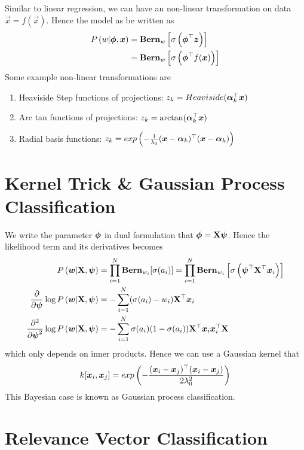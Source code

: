 Similar to linear regression, we can have an non-linear transformation on data $\vec{x}=f(\vec{x})$. Hence the model as be written as
\begin{align*}
	P\left(w|\boldsymbol{\phi},\boldsymbol{x}\right)&=\mathbf{Bern}_w\left[\sigma\left(\boldsymbol{\phi}^\top\boldsymbol{z}\right)\right] \\
	&=\mathbf{Bern}_w\left[\sigma\left(\boldsymbol{\phi}^\top f(\boldsymbol{x})\right)\right]
\end{align*}
Some example non-linear transformations are
\begin{enumerate}
	\item Heaviside Step functions of projections: $z_k=Heaviside(\boldsymbol{\alpha}_k^\top\boldsymbol{x})$
	\item Arc tan functions of projections: $z_k=\arctan(\boldsymbol{\alpha}_k^\top\boldsymbol{x})$
	\item Radial basis functions: $z_k=exp\left(-\frac{1}{\lambda_0}(\boldsymbol{x}-\boldsymbol{\alpha}_k){}^\top(\boldsymbol{x}-\boldsymbol{\alpha}_k)\right)$
\end{enumerate}



\section{Kernel Trick \& Gaussian Process Classification}
\label{section7.4}

We write the parameter $\boldsymbol{\phi}$ in dual formulation that $\boldsymbol{\phi}=\mathbf{X}\boldsymbol{\psi}$. Hence the likelihood term and its derivatives becomes
\begin{align*}
	P\left(\boldsymbol{w}|\mathbf{X},\boldsymbol{\psi}\right)&=\prod_{i=1}^N\mathbf{Bern}_{w_i}[\sigma(a_i)]=\prod_{i=1}^N\mathbf{Bern}_{w_i}\left[\sigma\left(\boldsymbol{\psi}^\top\mathbf{X}^\top\boldsymbol{x}_i\right)\right] \\
	\frac{\partial}{\partial\boldsymbol{\psi}}\log P\left(\boldsymbol{w}|\mathbf{X},\boldsymbol{\psi}\right)&=-\sum_{i=1}^N(\sigma(a_i)-w_i)\mathbf{X}^\top\boldsymbol{x}_i \\
	\frac{\partial^2}{\partial\boldsymbol{\psi}^2}\log P\left(\boldsymbol{w}|\mathbf{X},\boldsymbol{\psi}\right)&=-\sum_{i=1}^N\sigma(a_i)(1-\sigma(a_i))\mathbf{X}^\top\boldsymbol{x}_i\boldsymbol{x}_i^\top\mathbf{X}
\end{align*}
which only depends on inner products. Hence we can use a Gaussian kernel that
\begin{align*}
	k[\boldsymbol{x}_i,\boldsymbol{x}_j]=exp\left(-\frac{(\boldsymbol{x}_i-\boldsymbol{x}_j){}^\top(\boldsymbol{x}_i-\boldsymbol{x}_j)}{2\lambda_0^2}\right)
\end{align*}
This Bayesian case is known as Gaussian process classification.



\section{Relevance Vector Classification}
\label{section7.5}

